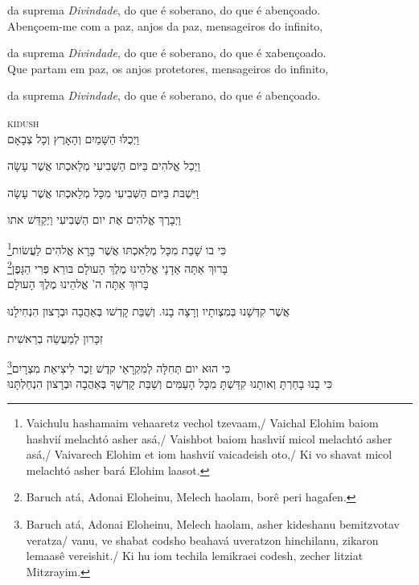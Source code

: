 da suprema \emph{Divindade}, do que é soberano, do que é abençoado.\\[10pt]

Abençoem-me com a paz, anjos da paz, mensageiros do infinito,

da suprema \emph{Divindade}, do que é soberano, do que é xabençoado.\\[10pt]

Que partam em paz, os anjos protetores, mensageiros do infinito,

da suprema \emph{Divindade}, do que é soberano, do que é abençoado.

\movetoevenpage
\raggedleft

\textsc{kidush}\\[15pt]

וַיְכֻלּוּ הַשָּׁמַיִם וְהָאָרֶץ וְכָל צְבָאָם

וַיְכַל אֱלהִים בַּיּום הַשְּׁבִיעִי מְלַאכְתּו אֲשֶׁר עָשָׂה

וַיִּשְׁבּת בַּיּום הַשְּׁבִיעִי מִכָּל מְלַאכְתּו אֲשֶׁר עָשָׂה

וַיְבָרֶךְ אֱלהִים אֶת יום הַשְּׁבִיעִי וַיְקַדֵּשׁ אתו

כִּי בו שָׁבַת מִכָּל מְלַאכְתּו אֲשֶׁר בָּרָא אֱלהִים לַעֲשׂות\footnote{Vaichulu hashamaim vehaaretz vechol tzevaam,/
Vaichal Elohim baiom hashvií melachtó asher asá,/
Vaishbot baiom hashvií micol melachtó asher asá,/
Vaivarech Elohim et iom hashvií vaicadeish oto,/
Ki vo shavat micol melachtó asher bará Elohim laasot.}\\[10pt]

בָּרוּךְ אַתָּה אַדָנָי אֱלהֵינוּ מֶלֶךְ הָעולָם בּורֵא פְּרִי הַגָּפֶן\footnote{Baruch atá, Adonai Eloheinu, Melech haolam, borê peri hagafen.}\\[10pt]

בָּרוּךְ אַתָּה ה' אֱלהֵינוּ מֶלֶךְ הָעולָם

אֲשֶׁר קִדְּשָׁנוּ בְּמִצְותָיו וְרָצָה בָנוּ. וְשַׁבַּת קָדְשׁו
בְּאַהֲבָה וּבְרָצון הִנְחִילָנוּ

זִכָּרון לְמַעֲשֵׂה בְרֵאשִׁית

כִּי הוּא יום תְּחִלָּה לְמִקְרָאֵי קדֶשׁ זֵכֶר לִיצִיאַת מִצְרָיִם\footnote{Baruch atá, Adonai Eloheinu, Melech haolam, asher kideshanu bemitzvotav veratza/
vanu, ve shabat codsho beahavá uveratzon hinchilanu, zikaron lemaasê vereishit./
Ki hu iom techila lemikraei codesh, zecher litziat Mitzrayim.}\\[10pt]

כִּי בָנוּ בָחַרְתָּ וְאותָנוּ קִדַּשְׁתָּ מִכָּל הָעַמִּים וְשַׁבַּת
קָדְשְׁךָ בְּאַהֲבָה וּבְרָצון הִנְחַלְתָּנוּ

